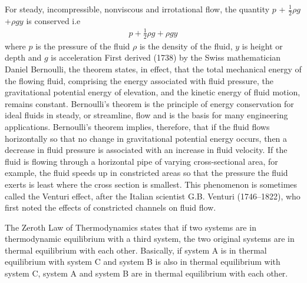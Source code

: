 \begin{phybox}{}
    {For steady, incompressible, nonviscous and irrotational flow, the quantity $p$ + $\frac{1}{2}\rho g$ +$\rho g y$
    is conserved i.e
    \begin{align*}
        p + \frac{1}{2} \rho g +\rho g y
    \end{align*}
    where $p$ is the pressure of the fluid $\rho$ is the density of the fluid, $y$ is height or depth and $g$ is acceleration}
    {First derived (1738) by the Swiss mathematician Daniel Bernoulli, the theorem states, in effect, that the total mechanical energy of the flowing fluid, comprising the energy associated with fluid pressure, the gravitational potential energy of elevation, and the kinetic energy of fluid motion, remains constant. Bernoulli’s theorem is the principle of energy conservation for ideal fluids in steady, or streamline, flow and is the basis for many engineering applications.}
    {Bernoulli’s theorem implies, therefore, that if the fluid flows horizontally so that no change in gravitational potential energy occurs, then a decrease in fluid pressure is associated with an increase in fluid velocity. If the fluid is flowing through a horizontal pipe of varying cross-sectional area, for example, the fluid speeds up in constricted areas so that the pressure the fluid exerts is least where the cross section is smallest. This phenomenon is sometimes called the Venturi effect, after the Italian scientist G.B. Venturi (1746–1822), who first noted the effects of constricted channels on fluid flow.}
\end{phybox}
\begin{chembox}{}
{The Zeroth Law of Thermodynamics states that if two systems are in thermodynamic equilibrium with a third system, the two original systems are in thermal equilibrium with each other. Basically, if system A is in thermal equilibrium with system C and system B is also in thermal equilibrium with system C, system A and system B are in thermal equilibrium with each other.}
\end{chembox}
